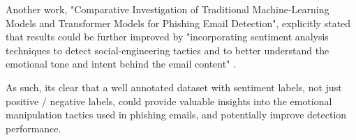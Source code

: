 Another work, "Comparative Investigation of Traditional Machine-Learning Models and Transformer Models for Phishing Email Detection", explicitly stated that results could be further improved by "incorporating sentiment analysis techniques to detect social-engineering tactics and to better understand the emotional tone and intent behind the email content" \cite{electronics13244877}.

As such, its clear that a well annotated dataset with sentiment labels, not just positive / negative labels, could provide valuable insights into the emotional manipulation tactics used in phishing emails, and potentially improve detection performance.

